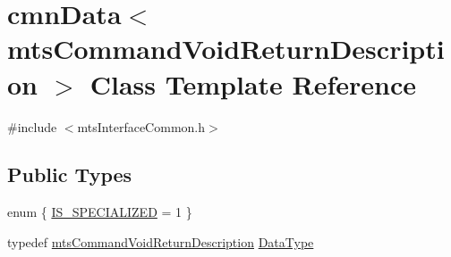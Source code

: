 \hypertarget{classcmn_data_3_01mts_command_void_return_description_01_4}{}\section{cmn\+Data$<$ mts\+Command\+Void\+Return\+Description $>$ Class Template Reference}
\label{classcmn_data_3_01mts_command_void_return_description_01_4}


{\ttfamily \#include $<$mts\+Interface\+Common.\+h$>$}

\subsection*{Public Types}
\begin{DoxyCompactItemize}
\item 
enum \{ \hyperlink{classcmn_data_3_01mts_command_void_return_description_01_4_a79bf965b757696b5c36308779329fca4a9b461dc10cde644de4a375a8da73eaf7}{I\+S\+\_\+\+S\+P\+E\+C\+I\+A\+L\+I\+Z\+E\+D} = 1
 \}
\item 
typedef \hyperlink{classmts_command_void_return_description}{mts\+Command\+Void\+Return\+Description} \hyperlink{classcmn_data_3_01mts_command_void_return_description_01_4_aff459b36dbdb34ec4dc27dbfea116040}{Data\+Type}
\end{DoxyCompactItemize}
